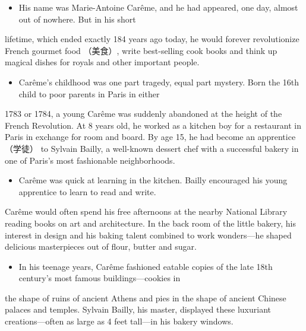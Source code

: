 \documentclass[UTF8,11pt]{ctexart}
\begin{document}
\begin{itemize}[leftmargin=2em,itemsep=.2em,topsep=.4em]\item[B.] His name was Marie-Antoine Carême, and he had appeared, one day, almost out of nowhere. But in his short
\end{itemize}

lifetime, which ended exactly 184 years ago today, he would forever revolutionize French gourmet food （美食）, write best-selling cook books and think up magical dishes for royals and other important people.


\begin{itemize}[leftmargin=2em,itemsep=.2em,topsep=.4em]\item[C.] Carême's childhood was one part tragedy, equal part mystery. Born the 16th child to poor parents in Paris in either
\end{itemize}

1783 or 1784, a young Carême was suddenly abandoned at the height of the French Revolution. At 8 years old, he worked as a kitchen boy for a restaurant in Paris in exchange for room and board. By age 15, he had become an apprentice （学徒） to Sylvain Bailly, a well-known dessert chef with a successful bakery in one of Paris's most fashionable neighborhoods.


\begin{itemize}[leftmargin=2em,itemsep=.2em,topsep=.4em]\item[D.] Carême was quick at learning in the kitchen. Bailly encouraged his young apprentice to learn to read and write.
\end{itemize}

Carême would often spend his free afternoons at the nearby National Library reading books on art and architecture. In the back room of the little bakery, his interest in design and his baking talent combined to work wonders—he shaped delicious masterpieces out of flour, butter and sugar.


\begin{itemize}[leftmargin=2em,itemsep=.2em,topsep=.4em]\item[E.] In his teenage years, Carême fashioned eatable copies of the late 18th century's most famous buildings—cookies in
\end{itemize}

the shape of ruins of ancient Athens and pies in the shape of ancient Chinese palaces and temples. Sylvain Bailly, his master, displayed these luxuriant creations—often as large as 4 feet tall—in his bakery windows.
\end{document}
